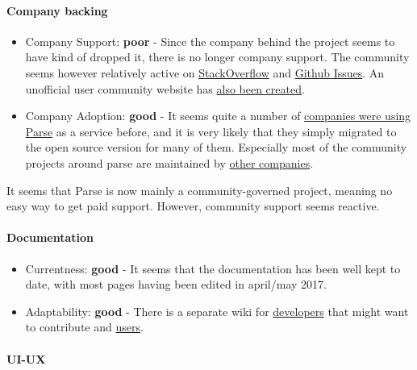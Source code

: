 \documentclass{article}
\begin{document}
\paragraph{Company backing}

\begin{itemize}
\item Company Support: \textbf{poor} - Since the company behind the project seems to have kind of dropped it, there is no longer company support. The community seems however relatively active on \href{https://stackoverflow.com/tags/parse.com}{StackOverflow} and \href{https://github.com/parse-community/parse-server/issues}{Github Issues}. An unofficial user community website has \href{http://parseopensource.github.io/}{also been created}.
\item Company Adoption: \textbf{good} - It seems quite a number of \href{https://www.quora.com/What-apps-are-built-on-Parse}{companies were using Parse} as a service before, and it is very likely that they simply migrated to the open source version for many of them. Especially most of the community projects around parse are maintained by \href{https://github.com/modernistik}{other companies}.
\end{itemize}

It seems that Parse is now mainly a community-governed project, meaning no easy way to get paid support. However, community support seems reactive.

\paragraph{Documentation}

\begin{itemize}
\item Currentness: \textbf{good} - It seems that the documentation has been well kept to date, with most pages having been edited in april/may 2017.
\item Adaptability: \textbf{good} - There is a separate wiki for \href{https://github.com/parse-community/parse-server/wiki}{developers} that might want to contribute and \href{http://docs.parseplatform.org/}{users}.
\end{itemize}

\paragraph{UI-UX}
\end{document}
